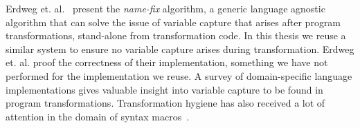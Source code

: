 Erdweg et. al.~\cite{Erdweg2014} present the \textit{name-fix} algorithm, a generic language agnostic algorithm that can solve the issue of variable capture that arises after program transformations, stand-alone from transformation code. In this thesis we reuse a similar system to ensure no variable capture arises during transformation. Erdweg et. al. proof the correctness of their implementation, something we have not performed for the implementation we reuse. A survey of domain-specific language implementations gives valuable insight into variable capture to be found in program transformations. Transformation hygiene has also received a lot of attention in the domain of syntax macros~\cite{Kohlbecker1986,Herman2010a,Disney2014}. 
